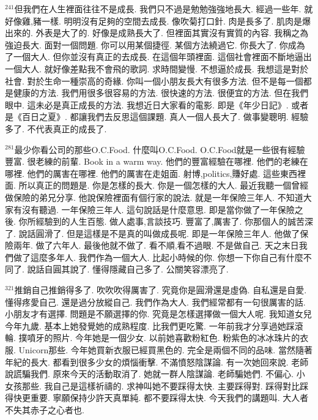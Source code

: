 \documentclass{book}
\begin{document}
$^{241}$但我們在人生裡面往往不是成長.
我們只不過是勉勉強強地長大.
經過一些年.
就好像雞,豬一樣.
明明沒有足夠的空間去成長.
像吹菊打口針.
肉是長多了.
肌肉是爆出來的.
外表是大了的.
好像是成熟長大了.
但裡面其實沒有實質的內容.
我稱之為強迫長大.
面對一個問題.
你可以用某個捷徑.
某個方法繞過它.
你長大了.
你成為了一個大人.
但你並沒有真正的去成長.
在這個年頭裡面.
這個社會裡面不斷地逼出一個大人.
就好像差點我不會飛的歌詞.
求時間變慢.
不想逼於成長.
我想這是對於社會.
對於生命一種崇高的奇緣.
你叫一個小朋友長大有很多方法.
但不是每一個都是健康的方法.
我們用很多很容易的方法.
很快速的方法.
很便宜的方法.
但在我們眼中.
這未必是真正成長的方法.
我想近日大家看的電影.
即是《年少日記》.
或者是《百日之夏》.
都讓我們去反思這個課題.
真人一個人長大了.
做事變聰明.
經驗多了.
不代表真正的成長了.

$^{281}$最少你看公司的那些O.C.Food.
什麼叫O.C.Food.
O.C.Food就是一些很有經驗豐富.
很老練的前輩.
Book in a warm way.
他們的豐富經驗在哪裡.
他們的老練在哪裡.
他們的厲害在哪裡.
他們的厲害在走姐面.
射博,politics,賺好處.
這些東西裡面.
所以真正的問題是.
你是怎樣的長大.
你是一個怎樣的大人.
最近我聽一個曾經做保險的弟兄分享.
他說保險裡面有個行家的說法.
就是一年保險三年人.
不知道大家有沒有聽過.
一年保險三年人.
這句說話是什麼意思.
即是當你做了一年保險之後.
你所經驗到的人生百態.
做人處事,言談技巧.
豐富了,厲害了.
你那個人的誠苦深了.
說話圓滑了.
但是這樣是不是真的叫做成長呢.
即是一年保險三年人.
他做了保險兩年.
做了六年人.
最後他就不做了.
看不順,看不過眼.
不是做自己.
天之末日我們做了這麼多年人.
我們作為一個大人.
比起小時候的你.
你想一下你自己有什麼不同了.
說話自圓其說了.
懂得隱藏自己多了.
公關笑容漂亮了.

$^{321}$推銷自己推銷得多了.
吹吹吹得厲害了.
究竟你是圓滑還是虛偽.
自私還是自愛.
懂得疼愛自己.
還是過分放縱自己.
我們作為大人.
我們經常都有一句很厲害的話.
小朋友才有選擇.
問題是不願選擇的你.
究竟是怎樣選擇做一個大人呢.
我知道女兒今年九歲.
基本上她發覺她的成熟程度.
比我們更吃驚.
一年前我才分享過她踩滾輪.
撲噴牙的照片.
今年她是一個少女.
以前她喜歡粉紅色.
粉紫色的冰冰珠片的衣服.
Unicorn那些.
今年她買新衣服已經買黑色的.
完全是兩個不同的品味.
當然隨著年紀的長大.
都看到很多少女的煩惱衝擊.
不滿憤怒陰謀論.
有一次她回來說.
老師說謊騙我們.
原來今天的活動取消了.
她就一群人陰謀論.
老師騙她們.
不偏心.
小女孩那些.
我自己是這樣祈禱的.
求神叫她不要踩得太快.
主要踩得對.
踩得對比踩得快更重要.
寧願保持少許天真單純.
都不要踩得太快.
今天我們的講題叫.
大人者不失其赤子之心者也.
\end{document}
